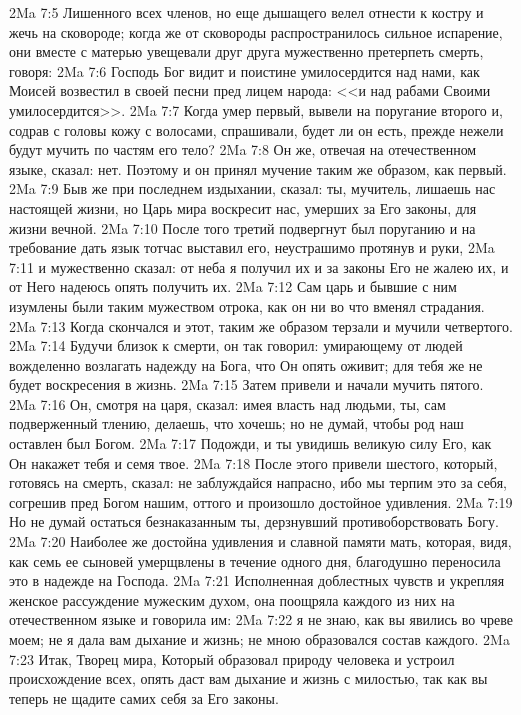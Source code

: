 \vs 2Ma 7:5 Лишенного всех членов, но еще дышащего велел отнести к костру и жечь на сковороде; когда же от сковороды распространилось сильное испарение, они вместе с матерью увещевали друг друга мужественно претерпеть смерть, говоря:
\vs 2Ma 7:6 Господь Бог видит и поистине умилосердится над нами, как Моисей возвестил в своей песни пред лицем народа: <<и над рабами Своими умилосердится>>.
\vs 2Ma 7:7 Когда умер первый, вывели на поругание второго и, содрав с головы кожу с волосами, спрашивали, будет ли он есть, прежде нежели будут мучить по частям его тело?
\vs 2Ma 7:8 Он же, отвечая на отечественном языке, сказал: нет. Поэтому и он принял мучение таким же образом, как первый.
\vs 2Ma 7:9 Быв же при последнем издыхании, сказал: ты, мучитель, лишаешь нас настоящей жизни, но Царь мира воскресит нас, умерших за Его законы, для жизни вечной.
\vs 2Ma 7:10 После того третий подвергнут был поруганию и на требование дать язык тотчас выставил его, неустрашимо протянув и руки,
\vs 2Ma 7:11 и мужественно сказал: от неба я получил их и за законы Его не жалею их, и от Него надеюсь опять получить их.
\vs 2Ma 7:12 Сам царь и бывшие с ним изумлены были таким мужеством отрока, как он ни во что вменял страдания.
\vs 2Ma 7:13 Когда скончался и этот, таким же образом терзали и мучили четвертого.
\vs 2Ma 7:14 Будучи близок к смерти, он так говорил: умирающему от людей вожделенно возлагать надежду на Бога, что Он опять оживит; для тебя же не будет воскресения в жизнь.
\vs 2Ma 7:15 Затем привели и начали мучить пятого.
\vs 2Ma 7:16 Он, смотря на царя, сказал: имея власть над людьми, ты, сам подверженный тлению, делаешь, что хочешь; но не думай, чтобы род наш оставлен был Богом.
\vs 2Ma 7:17 Подожди, и ты увидишь великую силу Его, как Он накажет тебя и семя твое.
\vs 2Ma 7:18 После этого привели шестого, который, готовясь на смерть, сказал: не заблуждайся напрасно, ибо мы терпим это за себя, согрешив пред Богом нашим, оттого и произошло достойное удивления.
\vs 2Ma 7:19 Но не думай остаться безнаказанным ты, дерзнувший противоборствовать Богу.
\vs 2Ma 7:20 Наиболее же достойна удивления и славной памяти мать, которая, видя, как семь ее сыновей умерщвлены в течение одного дня, благодушно переносила это в надежде на Господа.
\vs 2Ma 7:21 Исполненная доблестных чувств и укрепляя женское рассуждение мужеским духом, она поощряла каждого из них на отечественном языке и говорила им:
\vs 2Ma 7:22 я не знаю, как вы явились во чреве моем; не я дала вам дыхание и жизнь; не мною образовался состав каждого.
\vs 2Ma 7:23 Итак, Творец мира, Который образовал природу человека и устроил происхождение всех, опять даст вам дыхание и жизнь с милостью, так как вы теперь не щадите самих себя за Его законы.
